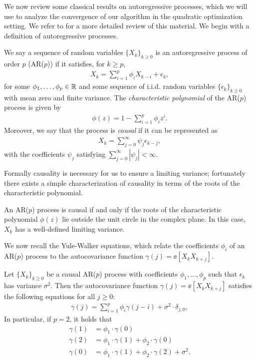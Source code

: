 We now review some classical results on autoregressive processes, which we will use to analyze the convergence of our algorithm in the quadratic optimization setting.  We refer to \citep{shumway2006time,brockwell2002introduction} for a more detailed review of this material.  We begin with a definition of autoregressive processes.
\begin{definition}\label{def:ar_process}
    We say a sequence of random variables $\{X_k\}_{k \geq 0}$ is an autoregressive process of order $p$ (AR($p$)) if it satisfies, for $k \geq p$,
    \begin{align}
        X_k = \sum_{i=1}^p \phi_i X_{k-i} + \epsilon_k,
    \end{align}
    for some $\phi_1, \dots, \phi_p \in \mathbb{R}$ and some sequence of i.i.d. random variables $\{\epsilon_k\}_{k \geq 0}$ with mean zero and finite variance.  The \emph{characteristic polynomial} of the AR($p$) process is given by
    \begin{align}
        \phi(z) = 1 - \sum_{i=1}^p \phi_i z^i.
    \end{align}
    Moreover, we say that the process is \emph{causal} if it can be represented as
    \begin{align}
        X_k = \sum_{j = 0}^\infty \psi_j \epsilon_{k-j},
    \end{align}
    with the coefficients $\psi_j$ satisfying $\sum_{j=0}^\infty |\psi_j| < \infty$.
\end{definition}
Formally causality is necessary for us to ensure a limiting variance; fortunately there exists a simple characterization of causality in terms of the roots of the characteristic polynomial.
\begin{proposition}\label{prop:causality}
    An AR($p$) process is causal if and only if the roots of the characteristic polynomial $\phi(z)$ lie outside the unit circle in the complex plane.  In this case, $X_k$ has a well-defined limiting variance.
\end{proposition}
We now recall the Yule-Walker equations, which relate the coefficients $\phi_i$ of an AR($p$) process to the autocovariance function $\gamma(j) = \ee[X_k X_{k+j}]$.
\begin{theorem}\label{thm:yule-walker}
    Let $\{X_k\}_{k \geq 0}$ be a causal AR($p$) process with coefficients $\phi_1, \dots, \phi_p$ such that $\epsilon_k$ has variance $\sigma^2$. Then the autocovariance function $\gamma(j) = \ee[X_k X_{k+j}]$ satisfies the following equations for all $j \geq 0$:
    \begin{align}
        \gamma(j) = \sum_{i=1}^p \phi_i \gamma(j - i) + \sigma^2 \cdot \delta_{j, 0},
    \end{align}
    In particular, if $p = 2$, it holds that
    \begin{align}
        \gamma(1) &= \phi_1 \cdot \gamma(0) \\
        \gamma(2) &= \phi_1 \cdot \gamma(1) + \phi_2 \cdot \gamma(0) \\
        \gamma(0) &= \phi_1 \cdot \gamma(1) + \phi_2 \cdot \gamma(2) + \sigma^2.
    \end{align}
\end{theorem}
